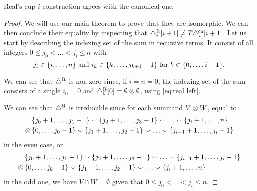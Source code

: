 \begin{theorem}
	Real's \mbox{cup-$i$} construction agrees with the canonical one.
\end{theorem}

\begin{proof}
	We will use our main theorem to prove that they are isomorphic.
	We can then conclude their equality by inspecting that $\triangle^{\mathrm{R}}_i [i+1] \neq T \triangle^{\!\mathrm{cn}}_i [i+1]$.
	Let us start by describing the indexing set of the sum in recursive terms.
	It consist of all integers $0 \leq j_0 < \dots < j_i \leq n$ with
	\begin{equation}\label{eq:indexing set recursively}
		j_i \in \{i,\dots,n\} \text{ and }
		i_k \in \{k,\dots,j_{k+1}-1\} \text{ for } k \in \{0,\dots,i-1\}.
	\end{equation}

	We can see that $\triangle^{\mathrm{R}}$ is non-zero since, if $i=n=0$, the indexing set of the sum consists of a single $i_0 = 0$ and $\triangle^{\mathrm{R}}_0 [0] = \emptyset \otimes \emptyset$, using \cref{eq:real left}.

	We can see that $\triangle^{\mathrm{R}}$ is irreducible since for each summand $V \otimes W$, equal to
	\begin{align*}
		&\{j_0+1,\dots,j_1-1\} \union \{j_2+1,\dots,j_3-1\} \union \dots \union \{j_i+1,\dots,n\} \\ \ot \,
		&\{0,\dots,j_0-1\} \union \{j_1+1,\dots,j_2-1\} \union \dots \union \{j_{i-1}+1,\dots,j_i-1\}
	\end{align*}
	in the even case, or
	\begin{align*}
		&\{j_0+1,\dots,j_1-1\} \union \{j_2+1,\dots,j_3-1\} \union \dots \union \{j_{i-1}+1,\dots,j_i-1\} \\ \ot \,
		&\{0,\dots,j_0-1\} \union \{j_1+1,\dots,j_2-1\} \union \dots \union \{j_i+1,\dots,n\}
	\end{align*}
	in the odd one, we have $V \cap W = \emptyset$ given that $0 \leq j_0 < \dots < j_i \leq n$.


\end{proof}
